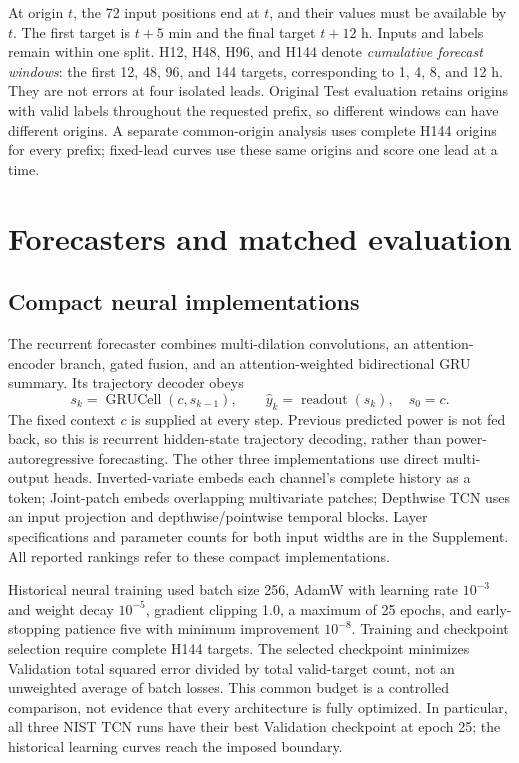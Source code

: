 \documentclass[aip,reprint,floatfix,amsmath,amssymb]{revtex4-2}
\begin{document}
At origin $t$, the 72 input positions end at $t$, and their values must be available by $t$. The first target is $t+5$ min and the final target $t+12$ h. Inputs and labels remain within one split. H12, H48, H96, and H144 denote \emph{cumulative forecast windows}: the first 12, 48, 96, and 144 targets, corresponding to 1, 4, 8, and 12 h. They are not errors at four isolated leads. Original Test evaluation retains origins with valid labels throughout the requested prefix, so different windows can have different origins. A separate common-origin analysis uses complete H144 origins for every prefix; fixed-lead curves use these same origins and score one lead at a time.

\section{Forecasters and matched evaluation}
\subsection{Compact neural implementations}
The recurrent forecaster combines multi-dilation convolutions, an attention-encoder branch, gated fusion, and an attention-weighted bidirectional GRU summary. Its trajectory decoder obeys
\begin{equation}
s_k=\operatorname{GRUCell}(c,s_{k-1}),\qquad \hat y_k=\operatorname{readout}(s_k),\quad s_0=c.
\end{equation}
The fixed context $c$ is supplied at every step. Previous predicted power is not fed back, so this is recurrent hidden-state trajectory decoding, rather than power-autoregressive forecasting. The other three implementations use direct multi-output heads. Inverted-variate embeds each channel's complete history as a token; Joint-patch embeds overlapping multivariate patches; Depthwise TCN uses an input projection and depthwise/pointwise temporal blocks. Layer specifications and parameter counts for both input widths are in the Supplement. All reported rankings refer to these compact implementations.

Historical neural training used batch size 256, AdamW with learning rate $10^{-3}$ and weight decay $10^{-5}$, gradient clipping 1.0, a maximum of 25 epochs, and early-stopping patience five with minimum improvement $10^{-8}$. Training and checkpoint selection require complete H144 targets. The selected checkpoint minimizes Validation total squared error divided by total valid-target count, not an unweighted average of batch losses. This common budget is a controlled comparison, not evidence that every architecture is fully optimized. In particular, all three NIST TCN runs have their best Validation checkpoint at epoch 25; the historical learning curves reach the imposed boundary.
\end{document}
